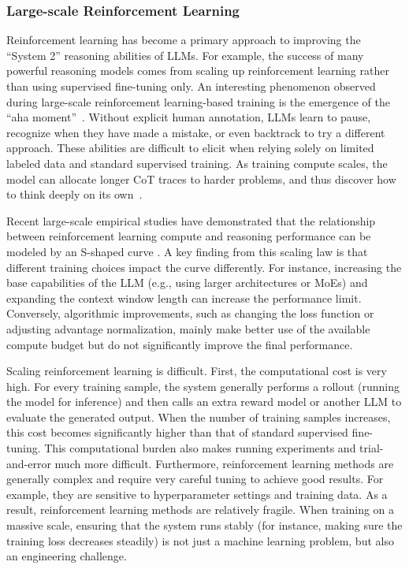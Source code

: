 \subsubsection{Large-scale Reinforcement Learning}

Reinforcement learning has become a primary approach to improving the ``System 2'' reasoning abilities of LLMs. For example, the success of many powerful reasoning models comes from scaling up reinforcement learning rather than using supervised fine-tuning only. An interesting phenomenon observed during large-scale reinforcement learning-based training is the emergence of the ``aha moment''~\cite{deepseek:2025r1}. Without explicit human annotation, LLMs learn to pause, recognize when they have made a mistake, or even backtrack to try a different approach. These abilities are difficult to elicit when relying solely on limited labeled data and standard supervised training. As training compute scales, the model can allocate longer CoT traces to harder problems, and thus discover how to think deeply on its own~\cite{snell-etal:2024scaling}.

Recent large-scale empirical studies have demonstrated that the relationship between reinforcement learning compute and reasoning performance can be modeled by an S-shaped curve \cite{khatri-etal:2025art,tan-etal:2026scaling}. A key finding from this scaling law is that different training choices impact the curve differently. For instance, increasing the base capabilities of the LLM (e.g., using larger architectures or MoEs) and expanding the context window length can increase the performance limit. Conversely, algorithmic improvements, such as changing the loss function or adjusting advantage normalization, mainly make better use of the available compute budget but do not significantly improve the final performance.

Scaling reinforcement learning is difficult. First, the computational cost is very high. For every training sample, the system generally performs a rollout (running the model for inference) and then calls an extra reward model or another LLM to evaluate the generated output. When the number of training samples increases, this cost becomes significantly higher than that of standard supervised fine-tuning. This computational burden also makes running experiments and trial-and-error much more difficult. Furthermore, reinforcement learning methods are generally complex and require very careful tuning to achieve good results. For example, they are sensitive to hyperparameter settings and training data. As a result, reinforcement learning methods are relatively fragile. When training on a massive scale, ensuring that the system runs stably (for instance, making sure the training loss decreases steadily) is not just a machine learning problem, but also an engineering challenge.

